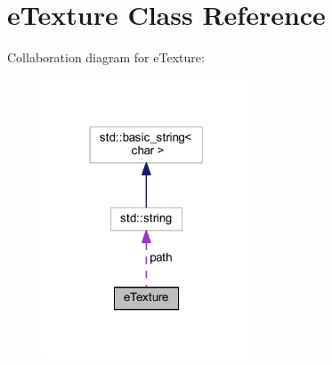 \hypertarget{classe_texture}{}\section{e\+Texture Class Reference}
\label{classe_texture}


Collaboration diagram for e\+Texture\+:
\nopagebreak
\begin{figure}[H]
\begin{center}
\leavevmode
\includegraphics[width=175pt]{classe_texture__coll__graph}
\end{center}
\end{figure}
